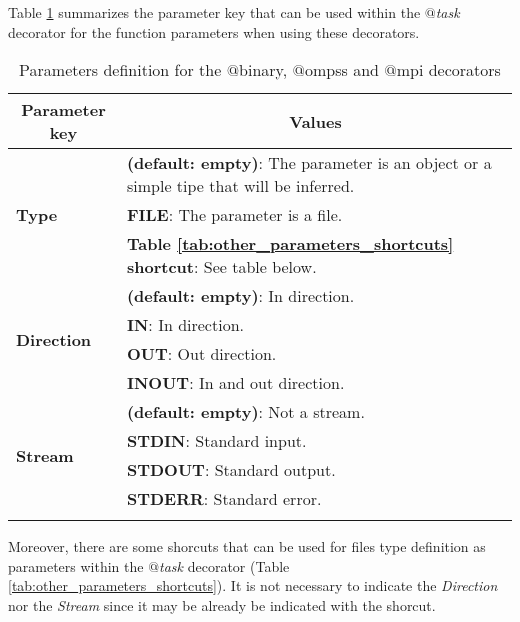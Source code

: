 Table \ref{tab:other_parameters} summarizes the parameter key that can be used within the {\it $@$task} decorator for the 
function parameters when using these decorators.

\bgroup
  \def\arraystretch{1.5}%
  \begin{longtable}{| p{} | p{} |}
    \hline
    \multicolumn{1}{|c|}{{\bf Parameter key}} &  \multicolumn{1}{c|}{{\bf Values }}\\
    \hline
        \multirow{3}{*}{{\bf Type}} & {\bf (default: empty)}: The parameter is an object or a simple tipe that will be inferred. \\
                                    & {\bf FILE}: The parameter is a file. \\
                                    & {\bf Table \ref{tab:other_parameters_shortcuts} shortcut}: See table below.\\
    \hline
        \multirow{4}{*}{{\bf Direction}} & {\bf (default: empty)}: In direction. \\
                                         & {\bf IN}: In direction. \\
                                         & {\bf OUT}: Out direction. \\
                                         & {\bf INOUT}: In and out direction. \\
    \hline
        \multirow{4}{*}{{\bf Stream}} & {\bf (default: empty)}: Not a stream. \\
                                      & {\bf STDIN}: Standard input. \\
                                      & {\bf STDOUT}: Standard output. \\
                                      & {\bf STDERR}: Standard error. \\
    \hline
     \caption{Parameters definition for the $@$binary, $@$ompss and $@$mpi decorators}
    \label{tab:other_parameters}
  \end{longtable}
\egroup

Moreover, there are some shorcuts that can be used for files type definition as parameters within the {\it $@$task} decorator (Table \ref{tab:other_parameters_shortcuts}).
It is not necessary to indicate the {\it Direction} nor the {\it Stream} since it may be already be indicated with the shorcut.

